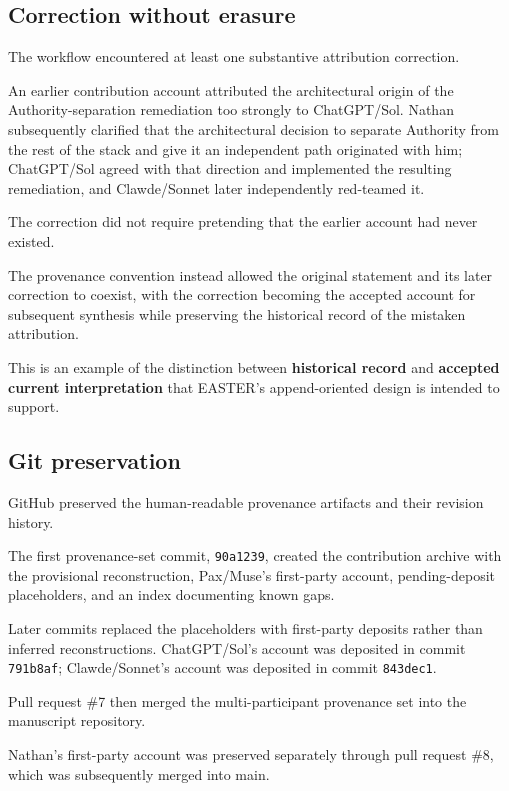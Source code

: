\documentclass[11pt]{article}
\begin{document}
\subsection{Correction without erasure}

The workflow encountered at least one substantive attribution correction.

An earlier contribution account attributed the architectural origin of the Authority-separation remediation too strongly to ChatGPT/Sol. Nathan subsequently clarified that the architectural decision to separate Authority from the rest of the stack and give it an independent path originated with him; ChatGPT/Sol agreed with that direction and implemented the resulting remediation, and Clawde/Sonnet later independently red-teamed it.

The correction did not require pretending that the earlier account had never existed.

The provenance convention instead allowed the original statement and its later correction to coexist, with the correction becoming the accepted account for subsequent synthesis while preserving the historical record of the mistaken attribution.

This is an example of the distinction between \textbf{historical record} and \textbf{accepted current interpretation} that EASTER's append-oriented design is intended to support.

\subsection{Git preservation}

GitHub preserved the human-readable provenance artifacts and their revision history.

The first provenance-set commit, \texttt{90a1239}, created the contribution archive with the provisional reconstruction, Pax/Muse's first-party account, pending-deposit placeholders, and an index documenting known gaps.

Later commits replaced the placeholders with first-party deposits rather than inferred reconstructions. ChatGPT/Sol's account was deposited in commit \texttt{791b8af}; Clawde/Sonnet's account was deposited in commit \texttt{843dec1}.

Pull request \#7 then merged the multi-participant provenance set into the manuscript repository.

Nathan's first-party account was preserved separately through pull request \#8, which was subsequently merged into main.
\end{document}
